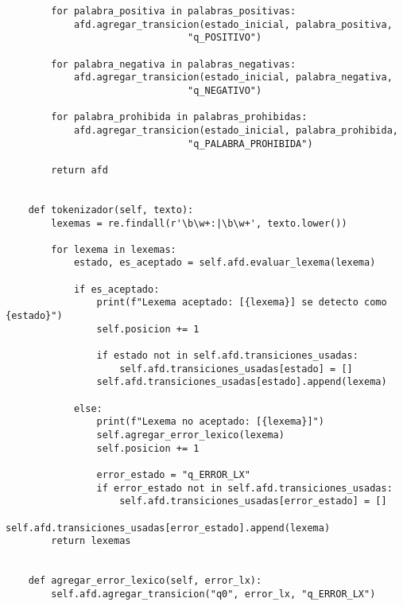 \documentclass[12pt,a4paper]{scrartcl} %
\begin{document}
\begin{verbatim}
        for palabra_positiva in palabras_positivas:
            afd.agregar_transicion(estado_inicial, palabra_positiva, 
                                "q_POSITIVO")

        for palabra_negativa in palabras_negativas:
            afd.agregar_transicion(estado_inicial, palabra_negativa, 
                                "q_NEGATIVO")
            
        for palabra_prohibida in palabras_prohibidas:
            afd.agregar_transicion(estado_inicial, palabra_prohibida, 
                                "q_PALABRA_PROHIBIDA")
        
        return afd


    def tokenizador(self, texto):
        lexemas = re.findall(r'\b\w+:|\b\w+', texto.lower())  
        
        for lexema in lexemas:
            estado, es_aceptado = self.afd.evaluar_lexema(lexema)
            
            if es_aceptado:
                print(f"Lexema aceptado: [{lexema}] se detecto como {estado}")
                self.posicion += 1
                
                if estado not in self.afd.transiciones_usadas:
                    self.afd.transiciones_usadas[estado] = []
                self.afd.transiciones_usadas[estado].append(lexema)

            else:
                print(f"Lexema no aceptado: [{lexema}]")
                self.agregar_error_lexico(lexema)
                self.posicion += 1
                
                error_estado = "q_ERROR_LX"
                if error_estado not in self.afd.transiciones_usadas:
                    self.afd.transiciones_usadas[error_estado] = []
                self.afd.transiciones_usadas[error_estado].append(lexema)
        return lexemas


    def agregar_error_lexico(self, error_lx):
        self.afd.agregar_transicion("q0", error_lx, "q_ERROR_LX")

\end{verbatim}
\end{document}
